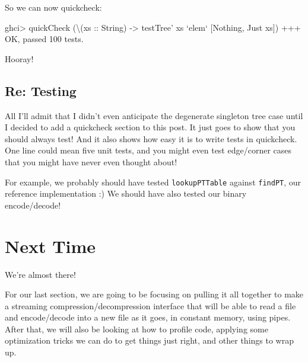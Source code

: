 \documentclass[]{article}
\newenvironment{Shaded}{\begin{snugshade}}{\end{snugshade}}
\newcommand{\DataTypeTok}[1]{\textcolor[rgb]{0.13,0.29,0.53}{#1}}
\newcommand{\DecValTok}[1]{\textcolor[rgb]{0.00,0.00,0.81}{#1}}
\newcommand{\FunctionTok}[1]{\textcolor[rgb]{0.00,0.00,0.00}{#1}}
\newcommand{\NormalTok}[1]{#1}
\newcommand{\OtherTok}[1]{\textcolor[rgb]{0.56,0.35,0.01}{#1}}
\begin{document}
So we can now quickcheck:

\begin{Shaded}
\begin{Highlighting}[]
\NormalTok{ghci}\FunctionTok{>}\NormalTok{ quickCheck (\textbackslash{}(}\OtherTok{xs ::} \DataTypeTok{String}\NormalTok{) }\OtherTok{->}\NormalTok{ testTree' xs }\OtherTok{`elem`}\NormalTok{ [}\DataTypeTok{Nothing}\NormalTok{, }\DataTypeTok{Just}\NormalTok{ xs])}
\FunctionTok{+++} \DataTypeTok{OK}\NormalTok{, passed }\DecValTok{100}\NormalTok{ tests}\FunctionTok{.}
\end{Highlighting}
\end{Shaded}

Hooray!

\hypertarget{re-testing}{%
\subsection{Re: Testing}\label{re-testing}}

All I'll admit that I didn't even anticipate the degenerate singleton tree case
until I decided to add a quickcheck section to this post. It just goes to show
that you should always test! And it also shows how easy it is to write tests in
quickcheck. One line could mean five unit tests, and you might even test
edge/corner cases that you might have never even thought about!

For example, we probably should have tested \texttt{lookupPTTable} against
\texttt{findPT}, our reference implementation :) We should have also tested our
binary encode/decode!

\hypertarget{next-time}{%
\section{Next Time}\label{next-time}}

We're almost there!

For our last section, we are going to be focusing on pulling it all together to
make a streaming compression/decompression interface that will be able to read a
file and encode/decode into a new file as it goes, in constant memory, using
pipes. After that, we will also be looking at how to profile code, applying some
optimization tricks we can do to get things just right, and other things to wrap
up.
\end{document}
